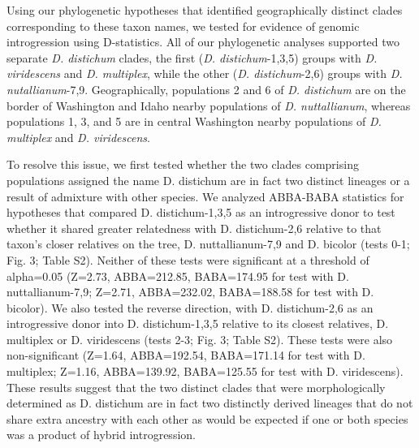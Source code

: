 \documentclass[11pt]{article}
\begin{document}


Using our phylogenetic hypotheses that identified geographically distinct clades corresponding
to these taxon names, we tested for evidence of genomic introgression using D-statistics. 
All of our phylogenetic analyses supported two separate 
\emph{D. distichum} clades, the first (\emph{D. distichum}-1,3,5) groups with 
\emph{D. viridescens} and \emph{D. multiplex}, while the other 
(\emph{D. distichum}-2,6) groups with \emph{D. nutallianum}-7,9. 
Geographically, populations 2 and 6 of \emph{D. distichum} are on the border of 
Washington and Idaho nearby populations of \emph{D. nuttallianum}, whereas 
populations 1, 3, and 5 are in central Washington nearby populations of 
\emph{D. multiplex} and \emph{D. viridescens}. 


To resolve this issue, we first tested whether the two clades comprising populations assigned the name D. distichum are in fact two distinct lineages or a result of admixture with other species. We analyzed ABBA-BABA statistics for hypotheses that compared D. distichum-1,3,5 as an introgressive donor to test whether it shared greater relatedness with D. distichum-2,6 relative to that taxon’s closer relatives on the tree, D. nuttallianum-7,9 and D. bicolor (tests 0-1; Fig. 3; Table S2). Neither of these tests were significant at a threshold of alpha=0.05 (Z=2.73, ABBA=212.85, BABA=174.95 for test with D. nuttallianum-7,9; Z=2.71, ABBA=232.02, BABA=188.58 for test with D. bicolor). We also tested the reverse direction, with D. distichum-2,6 as an introgressive donor into D. distichum-1,3,5 relative to its closest relatives, D. multiplex or D. viridescens (tests 2-3; Fig. 3; Table S2). These tests were also non-significant (Z=1.64, ABBA=192.54, BABA=171.14 for test with D. multiplex; Z=1.16, ABBA=139.92, BABA=125.55 for test with D. viridescens). These results suggest that the two distinct clades that were morphologically determined as D. distichum are in fact two distinctly derived lineages that do not share extra ancestry with each other as would be expected if one or both species was a product of hybrid introgression.
\end{document}
